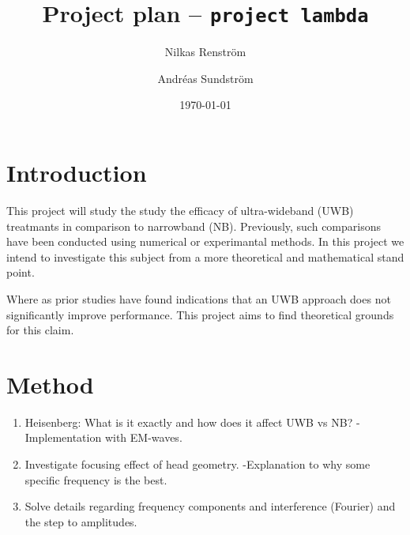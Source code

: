 \documentclass[11pt,a4paper, 
english, swedish %
]{article}
\begin{document}


%


\title{Project plan -- \texttt{project lambda}}
\author{Nilkas Renström \and Andréas Sundström}
\date{\today}

\maketitle







\section{Introduction}

This project will study the study the efficacy of
ultra-wideband (UWB) treatmants in comparison to narrowband (NB).
Previously, such comparisons have been conducted using numerical or
experimantal methods. In this project we intend to
investigate this subject from a more theoretical and mathematical
stand point. 

Where as prior studies have found indications that an UWB approach
does not significantly improve performance. This project aims to find 
theoretical grounds for this claim. 


\section{Method}


\begin{enumerate}
\item Heisenberg: What is it exactly and how does it affect UWB vs NB?
- Implementation with EM-waves.
\item Investigate focusing effect of head geometry. -Explanation to
why some specific frequency is the best.
\item Solve details regarding frequency components and interference
(Fourier) and the step to amplitudes. 
\end{enumerate}
\end{document}
